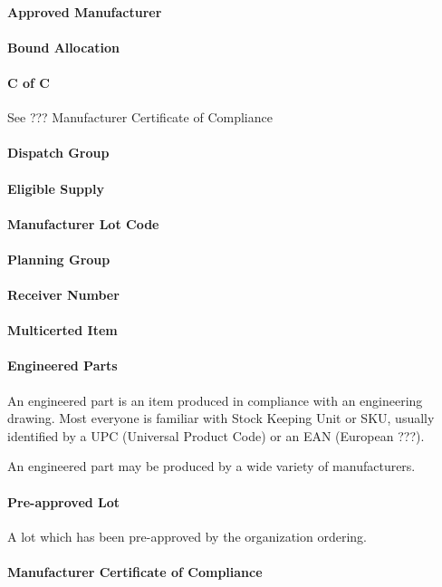 \documentclass[a4paper,10pt]{book}
\begin{document}
\paragraph{Approved Manufacturer}
\paragraph{Bound Allocation}
\paragraph{C of C}
See ??? Manufacturer Certificate of Compliance
\paragraph{Dispatch Group}
\paragraph{Eligible Supply}
\paragraph{Manufacturer Lot Code}
\paragraph{Planning Group}
\paragraph{Receiver Number}
\paragraph{Multicerted Item}

\paragraph{Engineered Parts}
An engineered part is an item produced in compliance with an engineering drawing.  Most everyone is familiar
with Stock Keeping Unit or SKU, usually identified by a UPC (Universal Product Code) or an EAN (European ???).

An engineered part may be produced by a wide variety of manufacturers.
\paragraph{Pre-approved Lot}  
A lot which has been pre-approved by the organization ordering.
\paragraph{Manufacturer Certificate of Compliance}
\end{document}
